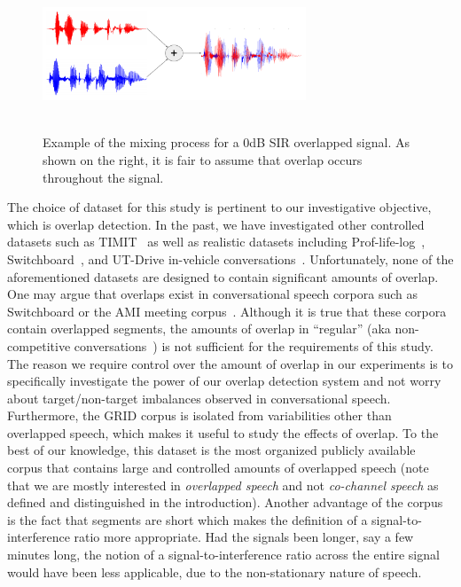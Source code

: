 \vspace{0mm}
\begin{figure}[h!]
	\centering
	\includegraphics[height =1.8in, width=0.7\textwidth]{figures/GRID_example_overlap-crop}
	\vspace{-2mm}
	\caption{
		Example of the mixing process for a 0dB SIR overlapped signal. As shown on the right, it is fair to assume that overlap occurs throughout the signal.}
	\label{fig:overlap_example}
\end{figure}

The choice of dataset for this study is pertinent to our investigative objective, which is overlap detection. 
In the past, we have investigated other controlled datasets such as TIMIT~\cite{nav_icassp13} as well as realistic datasets including Prof-life-log~\cite{ziaei2015proflifelog,nav_icassp15}, Switchboard~\cite{shokouhi2015}, and UT-Drive in-vehicle conversations~\cite{sathyanarayana2013beltup}. 
Unfortunately, none of the aforementioned datasets are designed to contain significant amounts of overlap. 
One may argue that overlaps exist in conversational speech corpora such as Switchboard or the AMI meeting corpus~\cite{amicorpus}. 
Although it is true that these corpora contain overlapped segments, the amounts of overlap in ``regular'' (aka non-competitive conversations~\cite{schegloff2000overlapping}) is not sufficient for the requirements of this study. 
The reason we require control over the amount of overlap in our experiments is to specifically investigate the power of our overlap detection system and not worry about target/non-target imbalances observed in conversational speech. 
Furthermore, the GRID corpus is isolated from variabilities other than overlapped speech, which makes it useful to study the effects of overlap. 
To the best of our knowledge, this dataset is the most organized publicly available corpus that contains large and controlled amounts of overlapped speech (note that we are mostly interested in {\it overlapped speech} and not {\it co-channel speech} as defined and distinguished in the introduction). 
Another advantage of the corpus is the fact that segments are short which makes the definition of a signal-to-interference ratio more appropriate. Had the signals been longer, say a few minutes long, the notion of a signal-to-interference ratio across the entire signal would have been less applicable, due to the non-stationary nature of speech. 

